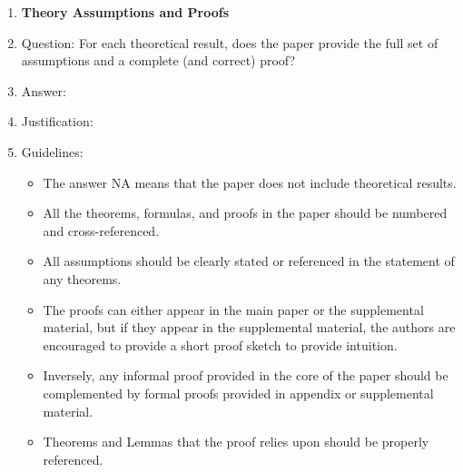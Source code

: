 \documentclass{article}
\begin{document}
\begin{enumerate}
\item {\bf Theory Assumptions and Proofs}
    \item[] Question: For each theoretical result, does the paper provide the full set of assumptions and a complete (and correct) proof?
    \item[] Answer: \answerTODO{} %
    \item[] Justification: \justificationTODO{}
    \item[] Guidelines:
    \begin{itemize}
        \item The answer NA means that the paper does not include theoretical results. 
        \item All the theorems, formulas, and proofs in the paper should be numbered and cross-referenced.
        \item All assumptions should be clearly stated or referenced in the statement of any theorems.
        \item The proofs can either appear in the main paper or the supplemental material, but if they appear in the supplemental material, the authors are encouraged to provide a short proof sketch to provide intuition. 
        \item Inversely, any informal proof provided in the core of the paper should be complemented by formal proofs provided in appendix or supplemental material.
        \item Theorems and Lemmas that the proof relies upon should be properly referenced. 
    \end{itemize}


\end{enumerate}
\end{document}
